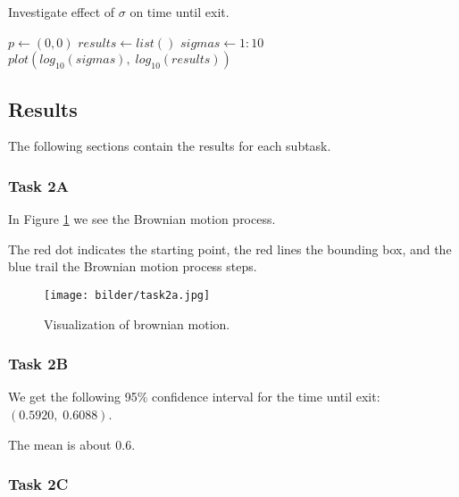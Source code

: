\begin{algorithm}[H]
    \label{alg:2C}
    \caption{Investigate effect of $\sigma$ on time until exit.}
    $p \gets (0,0)$ \;
    $results \gets list()$ 
    $sigmas \gets 1:10$
    $plot(log_{10}(sigmas),\; log_{10}(results))$
\end{algorithm}

\subsection{Results}
\label{sec:res2}


The following sections contain the results for each subtask.

\subsubsection{Task 2A}
\label{sec:res2A}

In Figure \ref{fig:2a} we see the Brownian motion process.

The red dot indicates the starting point, the red lines the bounding box, and the blue trail the Brownian motion process steps. 

\begin{figure}[H]
    \centering
    \texttt{[image: bilder/task2a.jpg]}
    \caption{Visualization of brownian motion.}
    \label{fig:2a}
\end{figure}

\subsubsection{Task 2B}
\label{sec:res2B}

We get the following 95\% confidence interval for the time until exit: $(0.5920, \;   0.6088)$.

The mean is about $0.6$.

\subsubsection{Task 2C}
\label{sec:res2C}


